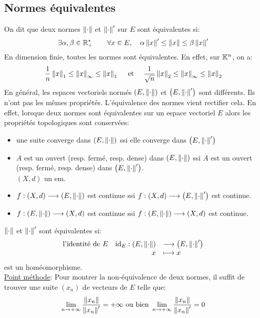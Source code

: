 \documentclass[12pt,a4paper]{article}
\begin{document}
	\subsection{Normes équivalentes}
	On dit que deux normes $\left\|{\cdot}\right\| $ et $\left\|{\cdot}\right\|'$ sur $E$ sont équivalentes si:
	\[ \exists \alpha,\beta\in\mathbb{R}^*_+\qquad \forall x\in E,\quad  \alpha\left\|{x}\right\|'\leq\left\|{x}\right\| \leq\beta \left\|{x}\right\|' \] 
	En dimension finie, toutes les normes sont équivalentes. En effet, sur $\mathbb{K}^n$, on a:
	\[ \dfrac{1}{n}\left\|{x}\right\|_1\leq\left\|{x}\right\|_{\infty} \leq \left\|{x}\right\|_1 \quad\text{ et }\quad \dfrac{1}{\sqrt{n}}\left\|{x}\right\|_2\leq\left\|{x}\right\|_{\infty} \leq \left\|{x}\right\|_2\]
	En général, les espaces vectoriels normés $\left(E,\left\|{\cdot}\right\|\right)$ et $\left(E,\left\|{\cdot}\right\|'\right)$ sont différents. Ils n'ont pas les mêmes propriétés. L'équivalence des normes vient rectifier cela. En effet, lorsque deux normes sont équivalentes sur un espace vectoriel $E$ alors les propriétés topologiques sont conservées:
	\begin{itemize}[label=$\bullet$]
		\item une suite converge dans  $\left(E,\left\|{\cdot}\right\|\right)$ ssi elle converge dans  $\left(E,\left\|{\cdot}\right\|'\right)$
		\item $A$ est un ouvert (resp. fermé, resp. dense) dans  $\left(E,\left\|{\cdot}\right\|\right)$ ssi $A$ est un ouvert (resp. fermé, resp. dense) dans $\left(E,\left\|{\cdot}\right\|'\right)$.\\
		$(X,d)$ un em. 
		\item $f:(X,d)\longrightarrow \left(E,\left\|{\cdot}\right\|\right)$ est continue ssi $f:(X,d)\longrightarrow \left(E,\left\|{\cdot}\right\|'\right)$ est continue.
		\item $f:\left(E,\left\|{\cdot}\right\|\right)\longrightarrow (X,d)$ est continue ssi  $f:\left(E,\left\|{\cdot}\right\|\right)\longrightarrow (X,d) $ est continue.	 
	\end{itemize}
	$\left\|{\cdot}\right\| $ et $\left\|{\cdot}\right\|'$ sont équivalentes si:
	\begin{equation*}
		\begin{array}[]{rll}
			\text{l'identité de $E$}\quad \text{id}_E: (E,\norm{\cdot}) &\longrightarrow \left(E,\norm{\cdot}'\right)\\
			x &\longmapsto x
		\end{array}
	\end{equation*}
	est un homéomorphisme.\\
	
	\underline{Point méthode}: Pour montrer la non-équivalence de deux normes, il suffit de trouver une suite $(x_n)$ de vecteurs de $E$ telle que:$$ \lim\limits_{n\to +\infty}\frac{\left\|{x_n}\right\|}{\left\|{x_n}\right\|'}=+\infty \text{ ou bien } \lim\limits_{n\to +\infty}\frac{\left\|{x_n}\right\|}{\left\|{x_n}\right\|'}=0$$ 
\end{document}
